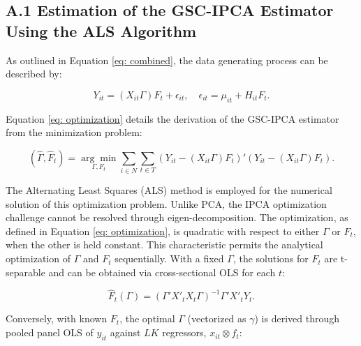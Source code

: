 \documentclass[12pt]{article}
\begin{document}
\setcounter{figure}{0}
\setcounter{table}{0}
\renewcommand\thetable{\Alph{section}.\arabic{table}}
\renewcommand\thefigure{\Alph{section}.\arabic{figure}}

\subsection*{A.1 Estimation of the GSC-IPCA Estimator Using the ALS Algorithm}

As outlined in Equation \ref{eq: combined}, the data generating process can be described by:

\begin{equation*}
Y_{it} = (X_{it}\Gamma) F_{t} + \epsilon_{it}, \quad \epsilon_{it} = \mu_{it} + H_{it} F_t.
\end{equation*}

Equation \ref{eq: optimization} details the derivation of the GSC-IPCA estimator from the minimization problem:

\begin{equation*}
(\hat{\Gamma}, \hat{F}_t) = \underset{\Gamma, F_t}{\arg\min} \sum_{i \in N} \sum_{t \in T} \left( Y_{it} - (X_{it}\Gamma) F_{t} \right)' \left( Y_{it} - (X_{it}\Gamma) F_{t} \right).
\end{equation*}

The Alternating Least Squares (ALS) method is employed for the numerical solution of this optimization problem. Unlike PCA, the IPCA optimization challenge cannot be resolved through eigen-decomposition. The optimization, as defined in Equation \ref{eq: optimization}, is quadratic with respect to either $\Gamma$ or $F_t$, when the other is held constant. This characteristic permits the analytical optimization of $\Gamma$ and $F_t$ sequentially. With a fixed $\Gamma$, the solutions for $F_t$ are t-separable and can be obtained via cross-sectional OLS for each $t$:

\begin{equation*}
\hat{F}_t(\Gamma) = (\Gamma' X'_t X_t \Gamma)^{-1} \Gamma' X'_t Y_t.
\end{equation*}

Conversely, with known $F_{t}$, the optimal $\Gamma$ (vectorized as $\gamma$) is derived through pooled panel OLS of $y_{it}$ against $LK$ regressors, $x_{it} \otimes f_t$:
\end{document}
